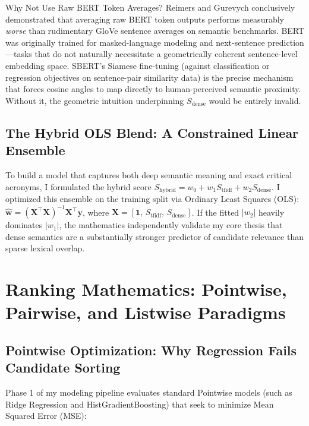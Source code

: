 \begin{remarkbox}{Why Not Use Raw BERT Token Averages?}
Reimers and Gurevych conclusively demonstrated that averaging raw BERT token outputs performs measurably \emph{worse} than rudimentary GloVe sentence averages on semantic benchmarks. BERT was originally trained for masked-language modeling and next-sentence prediction---tasks that do not naturally necessitate a geometrically coherent sentence-level embedding space. SBERT's Siamese fine-tuning (against classification or regression objectives on sentence-pair similarity data) is the precise mechanism that forces cosine angles to map directly to human-perceived semantic proximity. Without it, the geometric intuition underpinning $S_{\text{dense}}$ would be entirely invalid.
\end{remarkbox}

\subsection{The Hybrid OLS Blend: A Constrained Linear Ensemble}

To build a model that captures both deep semantic meaning and exact critical acronyms, I formulated the hybrid score $S_{\text{hybrid}} = w_0 + w_1 S_{\text{tfidf}} + w_2 S_{\text{dense}}$. I optimized this ensemble on the training split via Ordinary Least Squares (OLS): $\hat{\mathbf{w}} = (\mathbf{X}^\top\mathbf{X})^{-1}\mathbf{X}^\top\mathbf{y}$, where $\mathbf{X} = [\mathbf{1},\, S_{\text{tfidf}},\, S_{\text{dense}}]$. If the fitted $|w_2|$ heavily dominates $|w_1|$, the mathematics independently validate my core thesis that dense semantics are a substantially stronger predictor of candidate relevance than sparse lexical overlap.

\section{Ranking Mathematics: Pointwise, Pairwise, and Listwise Paradigms}
\label{sec:ranking_math}

\subsection{Pointwise Optimization: Why Regression Fails Candidate Sorting}

Phase 1 of my modeling pipeline evaluates standard Pointwise models (such as Ridge Regression and HistGradientBoosting) that seek to minimize Mean Squared Error (MSE):

